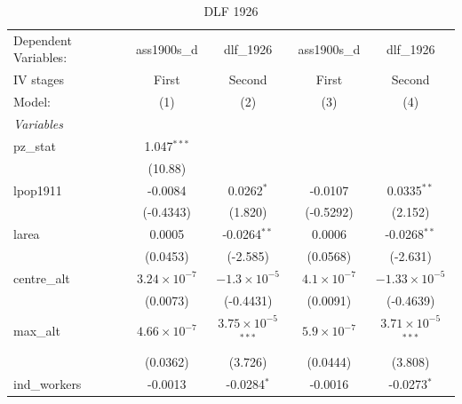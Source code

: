 
\begin{table}[htbp]
   \caption{DLF 1926}
   \centering
   \begin{tabular}{lcccc}
      \tabularnewline \midrule \midrule
      Dependent Variables:             & ass1900s\_d           & dlf\_1926                     & ass1900s\_d          & dlf\_1926\\   
      IV stages                        & First                 & Second                        & First                & Second \\   
      Model:                           & (1)                   & (2)                           & (3)                  & (4)\\  
      \midrule
      \emph{Variables}\\
      pz\_stat                         & 1.047$^{***}$         &                               &                      &   \\   
                                       & (10.88)               &                               &                      &   \\   
      lpop1911                         & -0.0084               & 0.0262$^{*}$                  & -0.0107              & 0.0335$^{**}$\\   
                                       & (-0.4343)             & (1.820)                       & (-0.5292)            & (2.152)\\   
      larea                            & 0.0005                & -0.0264$^{**}$                & 0.0006               & -0.0268$^{**}$\\   
                                       & (0.0453)              & (-2.585)                      & (0.0568)             & (-2.631)\\   
      centre\_alt                      & $3.24\times 10^{-7}$  & $-1.3\times 10^{-5}$          & $4.1\times 10^{-7}$  & $-1.33\times 10^{-5}$\\    
                                       & (0.0073)              & (-0.4431)                     & (0.0091)             & (-0.4639)\\   
      max\_alt                         & $4.66\times 10^{-7}$  & $3.75\times 10^{-5}$$^{***}$  & $5.9\times 10^{-7}$  & $3.71\times 10^{-5}$$^{***}$\\    
                                       & (0.0362)              & (3.726)                       & (0.0444)             & (3.808)\\   
      ind\_workers                     & -0.0013               & -0.0284$^{*}$                 & -0.0016              & -0.0273$^{*}$\\   

\end{tabular}
\end{table}
